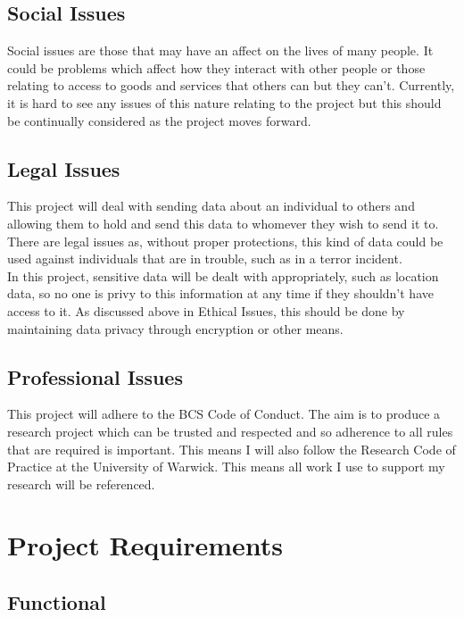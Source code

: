\documentclass{report}
\begin{document}
\section*{Social Issues}

Social issues are those that may have an affect on the lives of many people. It could be problems which 
affect how they interact with other people or those relating to access to goods and services that others can 
but they can't. Currently, it is hard to see any issues of this nature relating to the project but this should 
be continually considered as the project moves forward.

\section*{Legal Issues}

This project will deal with sending data about an individual to others and allowing them to hold and send this 
data to whomever they wish to send it to. There are legal issues as, without proper protections, this kind of 
data could be used against individuals that are in trouble, such as in a terror incident. 
\bigskip
\\
In this project, sensitive data will be dealt with appropriately, such as location data, so no one is privy to this 
information at any time if they shouldn't have access to it. As discussed above in Ethical Issues, this should be 
done by maintaining data privacy through encryption or other means.

\section*{Professional Issues}

This project will adhere to the BCS Code of Conduct\cite{BCSCoP}. The aim is to produce a 
research project which can be trusted and respected and so adherence to all rules that are required 
is important. This means I will also follow the Research Code of Practice at the University of Warwick\cite{UniWarwickCOP}. 
This means all work I use to support my research will be referenced. 

\chapter*{Project Requirements}

\section*{Functional}
\end{document}
